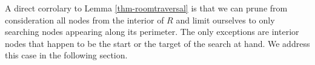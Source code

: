 A direct corrolary to Lemma \ref{thm-roomtraversal} is that we can prune from consideration
all nodes from the interior of $R$ and limit ourselves to only searching nodes appearing along its perimeter. The only exceptions are interior nodes that happen to be the start or the target
of the search at hand. We address this case in the following section.
